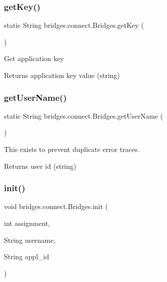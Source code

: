 \subsubsection{\texorpdfstring{getKey()}{getKey()}}
{\footnotesize\ttfamily static String bridges.\+connect.\+Bridges.\+get\+Key (\begin{DoxyParamCaption}{ }\end{DoxyParamCaption})\hspace{0.3cm}{\ttfamily [static]}}

Get application key

\begin{DoxyReturn}{Returns}
application key value (string) 
\end{DoxyReturn}
\mbox{\label{classbridges_1_1connect_1_1_bridges_a75f047cda3100e0cfa88378293c12961}} 
\subsubsection{\texorpdfstring{getUserName()}{getUserName()}}
{\footnotesize\ttfamily static String bridges.\+connect.\+Bridges.\+get\+User\+Name (\begin{DoxyParamCaption}{ }\end{DoxyParamCaption})\hspace{0.3cm}{\ttfamily [static]}}

This exists to prevent duplicate error traces.

\begin{DoxyReturn}{Returns}
user id (string) 
\end{DoxyReturn}
\mbox{\label{classbridges_1_1connect_1_1_bridges_a87aa73367a43cfc8b3ae5e4926ea4895}} 
\subsubsection{\texorpdfstring{init()}{init()}}
{\footnotesize\ttfamily void bridges.\+connect.\+Bridges.\+init (\begin{DoxyParamCaption}\item[{int}]{assignment,  }\item[{String}]{username,  }\item[{String}]{appl\+\_\+id }\end{DoxyParamCaption})}


